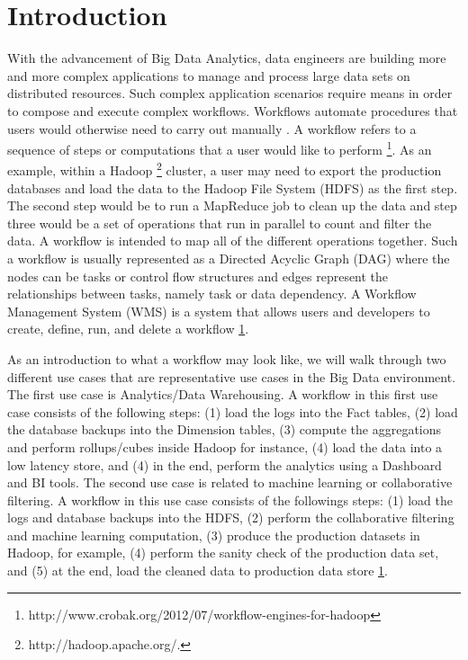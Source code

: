 \chapter{Introduction}
With the advancement of Big Data Analytics, data engineers are building more and more complex applications to manage and process large data sets on distributed resources. Such complex application scenarios require means in order to compose and execute complex workflows. Workflows automate procedures that users would otherwise need to carry out manually \cite{deelman2009workflows}. A workflow refers to a sequence of steps or computations that a user would like to perform 
\footnote{\label{crobak}http://www.crobak.org/2012/07/workflow-engines-for-hadoop}. As an example, within a Hadoop \footnote{\label{hadoop}http://hadoop.apache.org/.} cluster, a user may need to export the production databases and load the data to the Hadoop File System (HDFS) as the first step. The second step would be to run a MapReduce job to clean up the data and step three would be a set of operations that run in parallel to count and filter the data. A workflow is intended to map all of the different operations together. Such a workflow is usually represented as a Directed Acyclic Graph (DAG) where the nodes can be tasks or control flow structures and edges represent the relationships between tasks, namely task or data dependency. A Workflow Management System (WMS) is a system that allows users and developers to create, define, run, and delete a workflow \cref{crobak}. 
	
As an introduction to what a workflow may look like, we will walk through two different use cases that are representative use cases in the Big Data environment. The first use case is Analytics/Data Warehousing. A workflow in this first use case consists of the following steps: (1) load the logs into the Fact tables, (2) load the database backups into the Dimension tables, (3) compute the aggregations and perform rollups/cubes inside Hadoop for instance, (4) load the data into a low latency store, and (4) in the end, perform the analytics using a Dashboard and BI tools. The second use case is related to machine learning or collaborative filtering. A workflow in this use case consists of the followings steps: (1) load the logs and database backups into the HDFS, (2) perform the collaborative filtering and machine learning computation, (3) produce the production datasets in Hadoop, for example, (4) perform the sanity check of the production data set, and (5) at the end, load the cleaned data to production data store \cref{crobak}.

